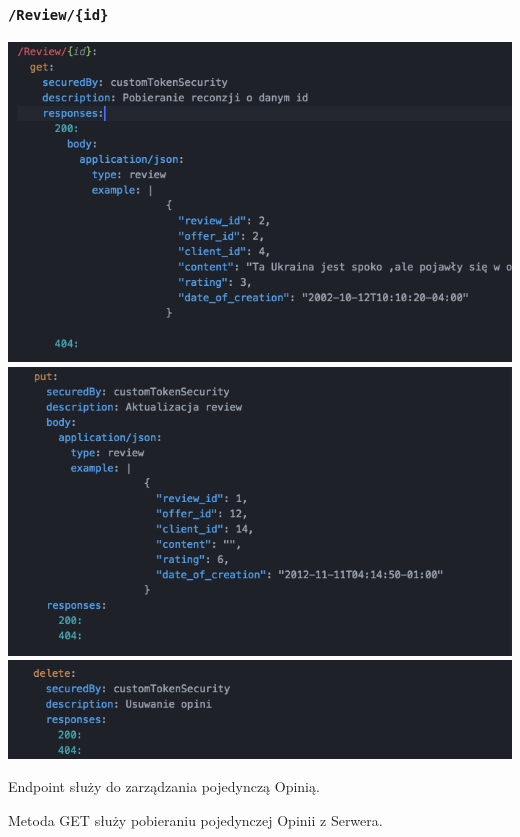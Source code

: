 \documentclass{article}
\begin{document}
\subsubsection{\texttt{/Review/\{id\}}}
\begin{center}
    \includegraphics[width=\linewidth]{Review+id/get.png} \newline
    \includegraphics[width=\linewidth]{Review+id/put.png} \newline
    \includegraphics[width=\linewidth]{Review+id/delete.png}\newline
\end{center}
Endpoint służy do zarządzania pojedynczą Opinią.

Metoda GET służy pobieraniu pojedynczej Opinii z Serwera.
\end{document}
